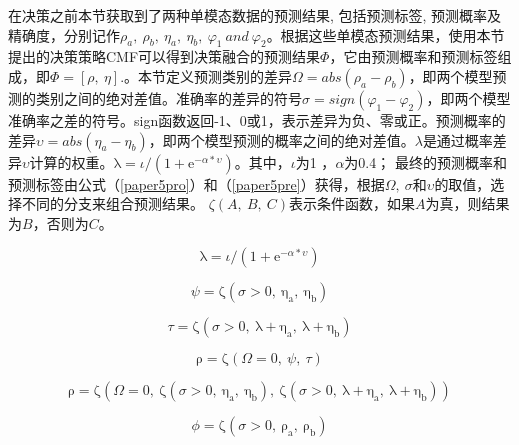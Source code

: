 在决策之前本节获取到了两种单模态数据的预测结果, 包括预测标签, 预测概率及精确度，分别记作$\rho_{a},~\rho_{b},~\eta_{a},~\eta_{b},~\varphi_{1}~and~\varphi_{2}$。根据这些单模态预测结果，使用本节提出的决策策略CMF可以得到决策融合的预测结果$\Phi$，它由预测概率和预测标签组成，即$\Phi = [\rho,~\eta].$。本节定义预测类别的差异$\Omega = abs(\rho_{a} - \rho_{b})$，即两个模型预测的类别之间的绝对差值。准确率的差异的符号$\sigma = sign(\varphi_{1} - \varphi_{2})$，即两个模型准确率之差的符号。sign函数返回-1、0或1，表示差异为负、零或正。预测概率的差异$\upsilon = abs(\eta_{a} - \eta_{b})$，即两个模型预测的概率之间的绝对差值。$\lambda$是通过概率差异$\upsilon$计算的权重。$\mathrm{\lambda=}\iota/(1+\mathrm{e}^{-\alpha * \upsilon} )$。其中，$\iota$为1 ，$\alpha$为0.4； 最终的预测概率和预测标签由公式（\ref{paper5pro}）和（\ref{paper5pre}）获得，根据$\Omega,~\sigma$和$\upsilon$的取值，选择不同的分支来组合预测结果。 $\zeta(A,~B,~C)$表示条件函数，如果$A$为真，则结果为$B$，否则为$C$。

\begin{equation}\label{paper5Ldif}
\mathrm{\lambda=}\iota/(1+\mathrm{e}^{-\alpha * \upsilon} )
\end{equation}
\fi

\begin{equation}\label{paper5proB}
\psi=\mathrm{\zeta}(\sigma>0,~\mathrm{\eta_{a}},~\mathrm{\eta_{b}})
\end{equation}

\begin{equation}\label{paper5proC}
\tau=\mathrm{\zeta}(\sigma>0,~\mathrm{\lambda}+\mathrm{\eta_{a}},~\mathrm{\lambda}+\mathrm{\eta_{b}})
\end{equation}

\begin{equation}\label{paper5pro}
\mathrm{\rho}=\mathrm{\zeta}(\Omega=0,~\psi,~\tau)
\end{equation}
\fi


\begin{equation}\label{paper5pro}
\mathrm{\rho}=\mathrm{\zeta}(\Omega=0,~\mathrm{\zeta}(\sigma>0,~\mathrm{\eta_{a}},~\mathrm{\eta_{b}}),~\mathrm{\zeta}(\sigma>0,~\mathrm{\lambda}+\mathrm{\eta_{a}},~\mathrm{\lambda}+\mathrm{\eta_{b}}))
\end{equation}



\begin{equation}\label{paper5preB}
\phi=\mathrm{\zeta}(\sigma>0,~\mathrm{\rho_{a}},~\mathrm{\rho_{b}})
\end{equation}

